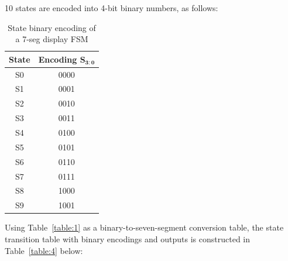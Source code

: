 \documentclass[12pt]{article}
\begin{document}
\begin{enumerate}
  10 states are encoded into 4-bit binary numbers, as follows:

  \begin{table}[ht]
    \centering
    \begin{tabular}{ | c | c | }
    \hline
    \textbf{State} & \textbf{Encoding} $\mathbf{S_{3:0}}$ \\ \hline
    S0             & 0000                                 \\ \hline
    S1             & 0001                                 \\ \hline
    S2             & 0010                                 \\ \hline
    S3             & 0011                                 \\ \hline
    S4             & 0100                                 \\ \hline
    S5             & 0101                                 \\ \hline
    S6             & 0110                                 \\ \hline
    S7             & 0111                                 \\ \hline
    S8             & 1000                                 \\ \hline
    S9             & 1001                                 \\ \hline
    \end{tabular}
    \caption{State binary encoding of a 7-seg display FSM}
    \label{table:3}
  \end{table}

  Using Table~\ref{table:1} as a binary-to-seven-segment conversion table, the state transition table with binary encodings and outputs is constructed in Table~\ref{table:4} below:


\end{enumerate}
\end{document}

